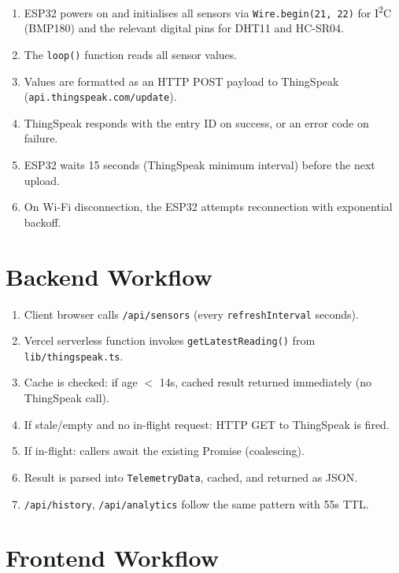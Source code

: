 \begin{enumerate}[leftmargin=1.5em]
  \item ESP32 powers on and initialises all sensors via \texttt{Wire.\allowbreak{}begin(21,\allowbreak{} 22)} for I\textsuperscript{2}C (BMP180) and the relevant digital pins for DHT11 and HC-SR04.
  \item The \texttt{loop()} function reads all sensor values.
  \item Values are formatted as an HTTP POST payload to ThingSpeak (\texttt{api.\allowbreak{}thingspeak.\allowbreak{}com/\allowbreak{}update}).
  \item ThingSpeak responds with the entry ID on success, or an error code on failure.
  \item ESP32 waits 15 seconds (ThingSpeak minimum interval) before the next upload.
  \item On Wi-Fi disconnection, the ESP32 attempts reconnection with exponential backoff.
\end{enumerate}

\section{Backend Workflow}

\begin{enumerate}[leftmargin=1.5em]
  \item Client browser calls \texttt{/\allowbreak{}api/\allowbreak{}sensors} (every \texttt{refreshInterval} seconds).
  \item Vercel serverless function invokes \texttt{getLatestReading()} from \texttt{lib/\allowbreak{}thingspeak.\allowbreak{}ts}.
  \item Cache is checked: if age $<$ 14s, cached result returned immediately (no ThingSpeak call).
  \item If stale/empty and no in-flight request: HTTP GET to ThingSpeak is fired.
  \item If in-flight: callers await the existing Promise (coalescing).
  \item Result is parsed into \texttt{TelemetryData}, cached, and returned as JSON.
  \item \texttt{/\allowbreak{}api/\allowbreak{}history}, \texttt{/\allowbreak{}api/\allowbreak{}analytics} follow the same pattern with 55s TTL.
\end{enumerate}

\section{Frontend Workflow}

